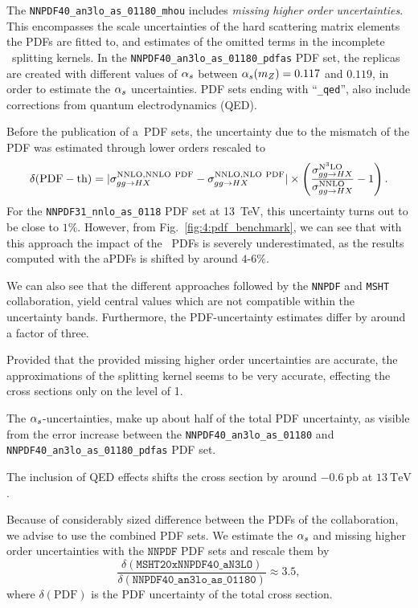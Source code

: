 The \texttt{NNPDF40\_an3lo\_as\_01180\_mhou} includes \textit{missing higher order uncertainties}. This encompasses the scale uncertainties of the hard scattering matrix elements the \acs{PDF}s are fitted to, and estimates of the omitted terms in the incomplete \NNNLO\ splitting kernels. In the \texttt{NNPDF40\_an3lo\_as\_01180\_pdfas} \acs{PDF} set, the replicas are created with different values of $\alpha_s$ between $\alpha_s (m_Z) = 0.117$ and $0.119$, in order to estimate the $\alpha_s$ uncertainties. \acs{PDF} sets ending with ``\texttt{\_qed}'', also include corrections from quantum electrodynamics (\acs{QED}).

Before the publication of a\NNNLO\ \acs{PDF} sets, the uncertainty due to the mismatch of the \acs{PDF} was estimated through lower orders rescaled to \NNNLO
\begin{equation}
\delta (\mathrm{PDF-th}) = \vert \sigma_{gg \rightarrow HX}^{\mathrm{NNLO}, \mathrm{NNLO\ PDF}} - \sigma_{gg \rightarrow HX}^{\mathrm{NNLO}, \mathrm{NLO\ PDF}} \vert \times \left( \frac{\sigma_{gg \rightarrow HX}^{\mathrm{N}^3\mathrm{LO}}}{\sigma_{gg \rightarrow HX}^{\mathrm{NNLO}}} - 1 \right).
\end{equation}
For the \texttt{NNPDF31\_nnlo\_as\_0118} \acs{PDF} set at 13~TeV, this uncertainty turns out to be close to $1\%$. However, from Fig.~\ref{fig:4:pdf_benchmark}, we can see that with this approach the impact of the \NNNLO\ \acs{PDF}s is severely underestimated, as the results computed with the a\NNNLO \acs{PDF}s is shifted by around $4$-$6\%$.

We can also see that the different approaches followed by the \texttt{NNPDF} and \texttt{MSHT} collaboration, yield central values which are not compatible within the uncertainty bands. Furthermore, the \acs{PDF}-uncertainty estimates differ by around a factor of three.

Provided that the provided missing higher order uncertainties are accurate, the approximations of the splitting kernel seems to be very accurate, effecting the cross sections only on the level of 1\textperthousand.

The $\alpha_s$-uncertainties, make up about half of the total \acs{PDF} uncertainty, as visible from the error increase between the \texttt{NNPDF40\_an3lo\_as\_01180} and \texttt{NNPDF40\_an3lo\_as\_01180\_pdfas} \acs{PDF} set.

The inclusion of \acs{QED} effects shifts the cross section by around $-0.6\ \mathrm{pb}$ at $13\ \mathrm{TeV}$.

Because of considerably sized difference between the \acs{PDF}s of the collaboration, we advise to use the combined \acs{PDF} sets. We estimate the $\alpha_s$ and missing higher order uncertainties with the $\texttt{NNPDF}$ \acs{PDF} sets and rescale them by
\begin{equation}
\frac{\delta (\mathtt{MSHT20xNNPDF40\_aN3LO})}{\delta (\mathtt{NNPDF40\_an3lo\_as\_01180})} \approx 3.5,
\end{equation}
where $\delta (\mathrm{PDF})$ is the \acs{PDF} uncertainty of the total cross section.

